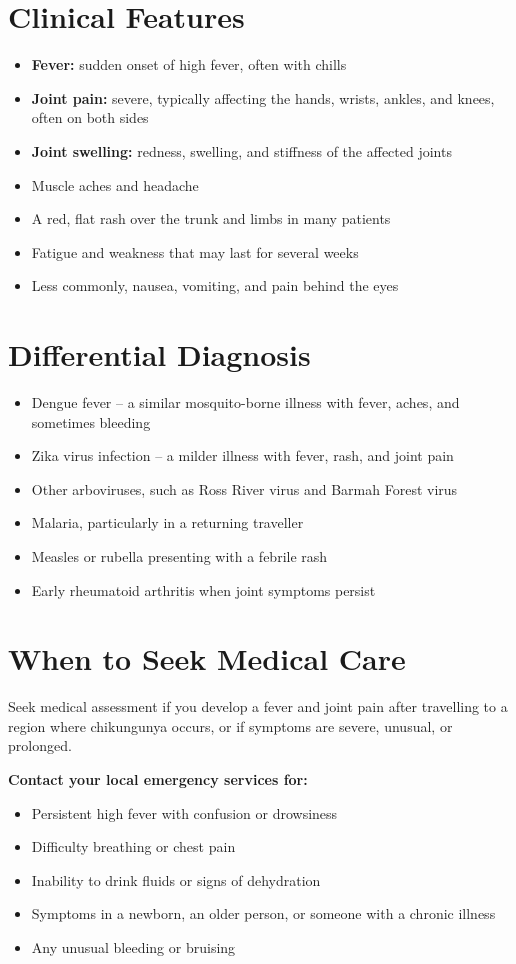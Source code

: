 \section*{Clinical Features}
\begin{itemize}
    \item \textbf{Fever:} sudden onset of high fever, often with chills
    \item \textbf{Joint pain:} severe, typically affecting the hands, wrists, ankles, and knees, often on both sides
    \item \textbf{Joint swelling:} redness, swelling, and stiffness of the affected joints
    \item Muscle aches and headache
    \item A red, flat rash over the trunk and limbs in many patients
    \item Fatigue and weakness that may last for several weeks
    \item Less commonly, nausea, vomiting, and pain behind the eyes
\end{itemize}

\section*{Differential Diagnosis}
\begin{itemize}
    \item Dengue fever -- a similar mosquito-borne illness with fever, aches, and sometimes bleeding
    \item Zika virus infection -- a milder illness with fever, rash, and joint pain
    \item Other arboviruses, such as Ross River virus and Barmah Forest virus
    \item Malaria, particularly in a returning traveller
    \item Measles or rubella presenting with a febrile rash
    \item Early rheumatoid arthritis when joint symptoms persist
\end{itemize}

\section*{When to Seek Medical Care}
Seek medical assessment if you develop a fever and joint pain after travelling to a region where chikungunya occurs, or if symptoms are severe, unusual, or prolonged.

\medskip
\textbf{Contact your local emergency services for:}
\begin{itemize}
    \item Persistent high fever with confusion or drowsiness
    \item Difficulty breathing or chest pain
    \item Inability to drink fluids or signs of dehydration
    \item Symptoms in a newborn, an older person, or someone with a chronic illness
    \item Any unusual bleeding or bruising
\end{itemize}

